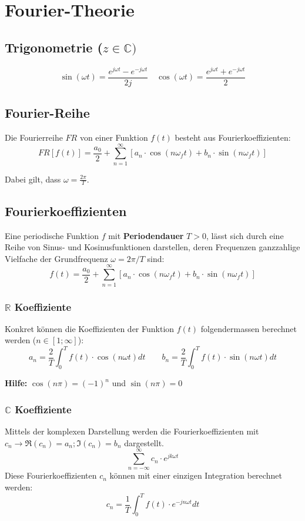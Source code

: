 \section{Fourier-Theorie}
\subsection{Trigonometrie ($z \in \mathbb{C})$}
\[\sin(\omega t) = \frac{e^{j\omega t} -e^{-j\omega t}}{2j} \quad \cos(\omega t) = \frac{e^{j\omega t} +e^{-j\omega t}}{2}\]


\subsection{Fourier-Reihe}
Die Fourierreihe $FR$ von einer Funktion $f(t)$ besteht aus Fourierkoeffizienten:
\[
FR[f(t)] = \frac{a_0}{2} + \sum_{n = 1}^{\infty}[a_n \cdot \cos(n\omega_ft) + b_n \cdot \sin(n\omega_ft)]
\]

\noindent Dabei gilt, dass $\omega = \frac{2\pi}{T}$.

\subsection{Fourierkoeffizienten}
Eine periodische Funktion $f$ mit \textbf{Periodendauer} $T > 0$, lässt sich durch eine Reihe von Sinus- und Kosinusfunktionen darstellen, deren Frequenzen ganzzahlige Vielfache der Grundfrequenz $\omega = 2\pi/T$ sind:
\[f(t) = \frac{a_0}{2} + \sum_{n = 1}^{\infty}[a_n \cdot \cos(n\omega_ft) + b_n \cdot \sin(n\omega_ft)]\]
\subsubsection{$\mathbb{R}$ Koeffiziente}
\noindent Konkret können die Koeffizienten der Funktion $f(t)$ folgendermassen berechnet werden ($n \in [1;\infty]$):
\[
a_n = \frac{2}{T}\int_{0}^{T}f(t) \cdot \cos(n\omega t)dt \qquad b_n = \frac{2}{T}\int_{0}^{T}f(t) \cdot \sin(n\omega t)dt
\]

\noindent\textbf{Hilfe:} $\cos(n\pi) = (-1)^n$ und $\sin(n\pi) = 0$ 
~\\

\subsubsection{$\mathbb{C}$ Koeffiziente}
\noindent Mittels der komplexen Darstellung werden die Fourierkoeffizienten mit $c_n \rightarrow \Re(c_n) = a_n; \Im(c_n) = b_n$ dargestellt.
\[
\sum_{n=-\infty}^{\infty}c_n \cdot e^{jk\omega t}
\]
Diese Fourierkoeffizienten $c_n$ können mit einer einzigen Integration berechnet werden:
\[
c_n = \frac{1}{T} \int_{0}^{T}f(t)\cdot e^{-jn\omega t} dt
\]

